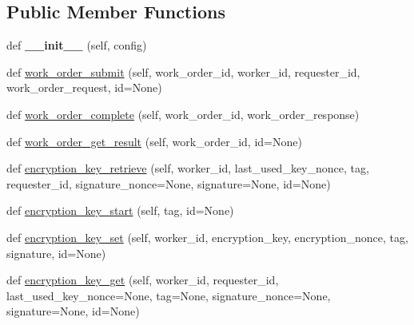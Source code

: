 \subsection*{Public Member Functions}
\begin{DoxyCompactItemize}
\item 
\mbox{\label{classavalon__sdk_1_1connector_1_1blockchains_1_1ethereum_1_1ethereum__work__order_1_1EthereumWorkOrderProxyImpl_a19208b9f758119ce0c0f4b443ce4befa}} 
def {\bfseries \+\_\+\+\_\+init\+\_\+\+\_\+} (self, config)
\item 
def \hyperlink{classavalon__sdk_1_1connector_1_1blockchains_1_1ethereum_1_1ethereum__work__order_1_1EthereumWorkOrderProxyImpl_a22f3deec94be323b4ed4417f7ba1e7df}{work\+\_\+order\+\_\+submit} (self, work\+\_\+order\+\_\+id, worker\+\_\+id, requester\+\_\+id, work\+\_\+order\+\_\+request, id=None)
\item 
def \hyperlink{classavalon__sdk_1_1connector_1_1blockchains_1_1ethereum_1_1ethereum__work__order_1_1EthereumWorkOrderProxyImpl_a7bb0ed06837f6e85c7d6ab8b2cd0ba8a}{work\+\_\+order\+\_\+complete} (self, work\+\_\+order\+\_\+id, work\+\_\+order\+\_\+response)
\item 
def \hyperlink{classavalon__sdk_1_1connector_1_1blockchains_1_1ethereum_1_1ethereum__work__order_1_1EthereumWorkOrderProxyImpl_a18e747b54b311cfdd6cf82b6393110ab}{work\+\_\+order\+\_\+get\+\_\+result} (self, work\+\_\+order\+\_\+id, id=None)
\item 
def \hyperlink{classavalon__sdk_1_1connector_1_1blockchains_1_1ethereum_1_1ethereum__work__order_1_1EthereumWorkOrderProxyImpl_a876e58bdd3fe19077f68a547b5ba7426}{encryption\+\_\+key\+\_\+retrieve} (self, worker\+\_\+id, last\+\_\+used\+\_\+key\+\_\+nonce, tag, requester\+\_\+id, signature\+\_\+nonce=None, signature=None, id=None)
\item 
def \hyperlink{classavalon__sdk_1_1connector_1_1blockchains_1_1ethereum_1_1ethereum__work__order_1_1EthereumWorkOrderProxyImpl_a4eed0ee0b27beed1e9973d8f98de7cf7}{encryption\+\_\+key\+\_\+start} (self, tag, id=None)
\item 
def \hyperlink{classavalon__sdk_1_1connector_1_1blockchains_1_1ethereum_1_1ethereum__work__order_1_1EthereumWorkOrderProxyImpl_aed6b169163674031961ad5c3c984e2a3}{encryption\+\_\+key\+\_\+set} (self, worker\+\_\+id, encryption\+\_\+key, encryption\+\_\+nonce, tag, signature, id=None)
\item 
def \hyperlink{classavalon__sdk_1_1connector_1_1blockchains_1_1ethereum_1_1ethereum__work__order_1_1EthereumWorkOrderProxyImpl_a5edd5782986bea823c9fbba67b901bcf}{encryption\+\_\+key\+\_\+get} (self, worker\+\_\+id, requester\+\_\+id, last\+\_\+used\+\_\+key\+\_\+nonce=None, tag=None, signature\+\_\+nonce=None, signature=None, id=None)
\end{DoxyCompactItemize}


